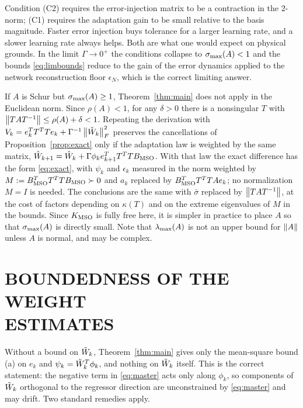 \begin{remark}[Interpretation]
Condition (C2) requires the error-injection matrix to be a contraction in the
$2$-norm; (C1) requires the adaptation gain to be small relative to the basis
magnitude. Faster error injection buys tolerance for a larger learning rate, and
a slower learning rate always helps. Both are what one would expect on physical
grounds. In the limit $\Gamma\to0^+$ the conditions collapse to
$\sigma_{\max}(A)<1$ and the bounds \eqref{eq:limbounds} reduce to the gain of the
error dynamics applied to the network reconstruction floor $\epsilon_N$, which
is the correct limiting answer.
\end{remark}

\begin{remark}\label{rem:nonnormal}
If $A$ is Schur but $\sigma_{\max}(A)\ge1$, Theorem~\ref{thm:main} does not apply in
the Euclidean norm. Since $\rho(A)<1$, for any $\delta>0$ there is a nonsingular
$T$ with $\left\lVert TAT^{-1} \right\rVert\le\rho(A)+\delta<1$. Repeating the derivation with
$V_k=e_k^TT^TTe_k+\Gamma^{-1}\left\lVert \tilde{W}_k \right\rVert_F^2$ preserves the cancellations of
Proposition~\ref{prop:exact} only if the adaptation law is weighted by the same
matrix, $\hat{W}_{k+1}=\hat{W}_k+\Gamma\phi_ke_{k+1}^TT^TTB_{\mathrm{MSO}}$. With that law the
exact difference has the form \eqref{eq:exact}, with $\psi_k$ and $\epsilon_k$
measured in the norm weighted by $M:=B_{\mathrm{MSO}}^TT^TTB_{\mathrm{MSO}}\succ0$ and $a_k$ replaced by
$B_{\mathrm{MSO}}^TT^TTAe_k$; no normalization $M=I$ is needed. The conclusions are the same
with $\bar\sigma$ replaced by $\left\lVert TAT^{-1} \right\rVert$, at the cost of factors depending
on $\kappa(T)$ and on the extreme eigenvalues of $M$ in the bounds. Since $K_{\mathrm{MSO}}$ is fully free here, it is simpler in
practice to place $A$ so that $\sigma_{\max}(A)$ is directly small. Note that
$\lambda_{\max}(A)$ is not an upper bound for $\left\lVert A \right\rVert$ unless $A$ is normal, and may be
complex.
\end{remark}

\section[BOUNDEDNESS OF THE WEIGHT ESTIMATES]{BOUNDEDNESS OF THE WEIGHT\\ESTIMATES}
\label{sec:weightbound}

Without a bound on $\tilde{W}_k$, Theorem~\ref{thm:main} gives only the
mean-square bound (a) on $e_k$ and $\psi_k=\tilde{W}_k^T\phi_k$, and nothing on
$\tilde{W}_k$ itself. This is the correct statement: the negative term in \eqref{eq:master} acts only along
$\phi_k$, so components of $\tilde{W}_k$ orthogonal to the regressor direction are
unconstrained by \eqref{eq:master} and may drift. Two standard remedies apply.

